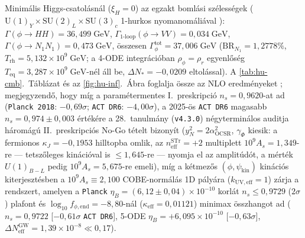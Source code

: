 \documentclass[11pt,a4paper]{article}
\begin{document}
Minimális Higgs-csatolásnál ($\xi_H = 0$) az egzakt bomlási szélességek ($\mathrm{U}(1)_Y \times \mathrm{SU}(2)_L \times \mathrm{SU}(3)_c$ 1-hurkos nyomanomáliával \cite{Watanabe2011}): $\Gamma(\phi\to HH) = 36{,}499\;\mathrm{GeV}$, $\Gamma_{\mathrm{1\text{-}loop}}(\phi\to VV) = 0{,}034\;\mathrm{GeV}$, $\Gamma(\phi\to N_1 N_1) = 0{,}473\;\mathrm{GeV}$, összesen $\Gamma_\phi^{\mathrm{tot}} = 37{,}006\;\mathrm{GeV}$ ($\mathrm{BR}_{N_1} = 1{,}2778\%$, $T_{\mathrm{rh}} = 5{,}132\times 10^9\;\mathrm{GeV}$; a 4-ODE integrációban $\rho_\phi = \rho_r$ egyenlőség $T_{\mathrm{eq}} = 3{,}287\times 10^9\;\mathrm{GeV}$-nél áll be, $\Delta N_* = -0{,}0209$ eltolással). A \ref{tab:hu-cmb}.\ Táblázat és az \ref{fig:hu-inf}.\ Ábra foglalja össze az NLO eredményeket \cite{LiddleLeach2003,StewartLyth1993}; megjegyzendő, hogy míg a paramétermentes I.\ preskripció $n_s = 0{,}9620$-at ad (\texttt{Planck 2018}: $-0{,}69\sigma$; \texttt{ACT DR6}: $-4{,}00\sigma$), a 2025-ös \texttt{ACT DR6} magasabb $n_s = 0{,}974 \pm 0{,}003$ értékére \cite{ACTDR6_2025} a 28.\ tanulmány (\texttt{v4.3.0}) négyterminálos auditja háromágú II.\ preskripciós No-Go tételt bizonyít ($y_N^2 = 2\alpha_{\mathrm{OCSR}}^2$, $\gamma_\Phi$ kiesik: a fermionos $\kappa_J = -0{,}1953$ hilltopba omlik, az $n_{\mathrm{eff}}^{\mathrm{STr}} = +2$ multiplett $10^9 A_s = 1{,}349$-re — tetszőleges kinációval is $\le 1{,}645$-re — nyomja el az amplitúdót, a mérték $U(1)_{B-L}$ pedig $10^9 A_s = 5{,}675$-re emeli), míg a kétmezős $(\phi,\psi_{\mathrm{kin}})$ kinációs kiterjesztésben a $10^9 A_s \equiv 2{,}100$ COBE-normálás 1D pályára ($k_{\mathrm{UV,eff}} = 1$) zárja a rendszert, amelyen a \texttt{Planck} $\eta_B = (6{,}12 \pm 0{,}04)\times 10^{-10}$ korlát $n_s \le 0{,}9729$ ($2\sigma$) plafont és $\log_{10} f_{\phi,\mathrm{end}} = -8{,}80$-nál ($\kappa_{\mathrm{eff}} = 0{,}01121$) minimax összhangot ad ($n_s = 0{,}9722$ [$-0{,}61\sigma$ \texttt{ACT DR6}], 5-ODE $\eta_B = +6{,}095\times 10^{-10}$ [$-0{,}63\sigma$], $\Delta N_{\mathrm{eff}}^{\mathrm{GW}} = 1{,}39\times 10^{-8} \ll 0{,}17$).
\end{document}

